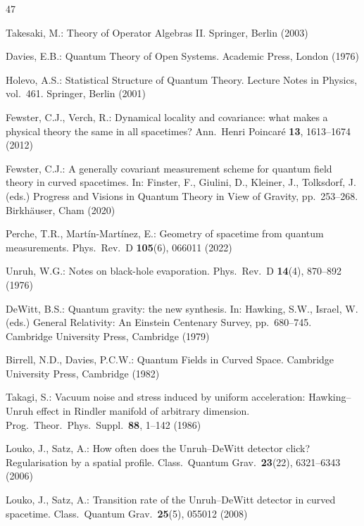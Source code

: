 \begin{thebibliography}{47}


Takesaki, M.:
Theory of Operator Algebras II.
Springer, Berlin (2003)

Davies, E.B.:
Quantum Theory of Open Systems.
Academic Press, London (1976)

Holevo, A.S.:
Statistical Structure of Quantum Theory.
Lecture Notes in Physics, vol.~461.
Springer, Berlin (2001)

Fewster, C.J., Verch, R.:
Dynamical locality and covariance: what makes a physical theory the same in all spacetimes?
Ann.\ Henri Poincar\'e \textbf{13}, 1613--1674 (2012)

Fewster, C.J.:
A generally covariant measurement scheme for quantum field theory in curved spacetimes.
In: Finster, F., Giulini, D., Kleiner, J., Tolksdorf, J. (eds.)
Progress and Visions in Quantum Theory in View of Gravity, pp.~253--268.
Birkh\"auser, Cham (2020)

Perche, T.R., Mart\'in-Mart\'inez, E.:
Geometry of spacetime from quantum measurements.
Phys.\ Rev.\ D \textbf{105}(6), 066011 (2022)


Unruh, W.G.:
Notes on black-hole evaporation.
Phys.\ Rev.\ D \textbf{14}(4), 870--892 (1976)

DeWitt, B.S.:
Quantum gravity: the new synthesis.
In: Hawking, S.W., Israel, W. (eds.)
General Relativity: An Einstein Centenary Survey, pp.~680--745.
Cambridge University Press, Cambridge (1979)

Birrell, N.D., Davies, P.C.W.:
Quantum Fields in Curved Space.
Cambridge University Press, Cambridge (1982)

Takagi, S.:
Vacuum noise and stress induced by uniform acceleration: Hawking--Unruh effect in Rindler manifold of arbitrary dimension.
Prog.\ Theor.\ Phys.\ Suppl.\ \textbf{88}, 1--142 (1986)

Louko, J., Satz, A.:
How often does the Unruh--DeWitt detector click? Regularisation by a spatial profile.
Class.\ Quantum Grav.\ \textbf{23}(22), 6321--6343 (2006)

Louko, J., Satz, A.:
Transition rate of the Unruh--DeWitt detector in curved spacetime.
Class.\ Quantum Grav.\ \textbf{25}(5), 055012 (2008)


\end{thebibliography}
